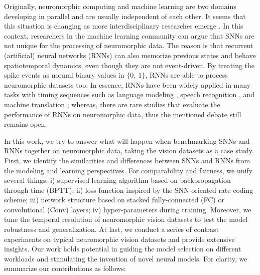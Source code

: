 \documentclass[journal,10pt,twocolumn]{IEEETran}
\begin{document}
Originally, neuromorphic computing and machine learning are two domains developing in parallel and are usually independent of each other. It seems that this situation is changing as more interdisciplinary researches emerge \cite{pei2019towards,deng2020tianjic,deng2020rethinking}. In this context, researchers in the machine learning community can argue that SNNs are not unique for the processing of neuromorphic data. The reason is that recurrent (artificial) neural networks (RNNs) can also memorize previous states and behave spatiotemporal dynamics, even though they are not event-driven. By treating the spike events as normal binary values in $\{0,~1\}$, RNNs are able to process neuromorphic datasets too. In essence, RNNs have been widely applied in many tasks with timing sequences such as language modeling \cite{mikolov2012statistical}, speech recognition \cite{miao2015eesen}, and machine translation \cite{cho2014learning}; whereas, there are rare studies that evaluate the performance of RNNs on neuromorphic data, thus the mentioned debate still remains open. 

In this work, we try to answer what will happen when benchmarking SNNs and RNNs together on neuromorphic data, taking the vision datasets as a case study. First, we identify the similarities and differences between SNNs and RNNs from the modeling and learning perspectives. For comparability and fairness, we unify several things: i) supervised learning algorithm based on backpropagation through time (BPTT); ii) loss function inspired by the SNN-oriented rate coding scheme; iii) network structure based on stacked fully-connected (FC) or convolutional (Conv) layers; iv) hyper-parameters during training. Moreover, we tune the temporal resolution of neuromorphic vision datasets to test the model robustness and generalization. At last, we conduct a series of contrast experiments on typical neuromorphic vision datasets and provide extensive insights. Our work holds potential in guiding the model selection on different workloads and stimulating the invention of novel neural models. For clarity, we summarize our contributions as follows:
\end{document}
